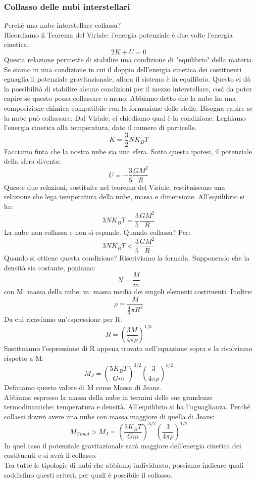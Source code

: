 \documentclass[a4paper,11pt]{article}
\begin{document}
\subsubsection{Collasso delle nubi interstellari}
Perché una nube interstellare collassa?\\
Ricordiamo il Teorema del Viriale: l'energia potenziale è due volte l'energia cinetica.
$$
2K + U = 0
$$
Questa relazione permette di stabilire una condizione di "equilibrio" della materia. Se siamo in una condizione in cui il doppio dell'energia cinetica dei costituenti eguaglia il potenziale gravitazionale, allora il sistema è in equilibrio. Questo ci dà la possibilità di stabilire alcune condizioni per il mezzo interstellare, così da poter capire se questo possa collassare o meno. Abbiamo detto che la nube ha una composizione chimica compatibile con la formazione delle stelle. Bisogna capire se la nube può collassare. Dal Viriale, ci chiediamo qual è la condizione. Leghiamo l'energia cinetica alla temperatura, dato il numero di particelle. \\
$$
K = \frac{3}{2} N K_{B} T
$$
Facciamo finta che la nostra nube sia una sfera. Sotto questa ipotesi, il potenziale della sfera diventa:
$$
U = - \frac{3}{5} \frac{GM^{2}}{R}
$$
Queste due relazioni, sostituite nel teorema del Viriale, restituiscono una relazione che lega temperatura della nube, massa e dimensione. All'equilibrio si ha:
$$
3NK_{B}T=\frac{3}{5} \frac{GM^{2}}{R}
$$
La nube non collassa e non si espande. Quando collassa? Per:
$$
3NK_{B}T <\frac{3}{5} \frac{GM^{2}}{R}
$$
Quando si ottiene questa condizione? Riscriviamo la formula. Supponendo che la densità sia costante, poniamo:
$$
N = \frac{M}{m}
$$
con M: massa della nube; m: massa media dei singoli elementi costituenti. Inoltre:
$$
\rho = \frac{M}{\frac{4}{3}\pi R^{3}}
$$
Da cui ricaviamo un'espressione per R:
$$
R = (\frac{3M}{4\pi \rho})^{1/3}
$$
Sostituiamo l'espressione di R appena trovata nell'equazione sopra e la risolviamo rispetto a M:
$$
M_{J}=(\frac{5K_{B}T}{Gm})^{3/2} (\frac{3}{4\pi \rho})^{1/2}
$$
Definiamo questo valore di M come Massa di Jeans.\\ Abbiamo espresso la massa della nube in termini delle sue grandezze termodinamiche: temperatura e densità. All'equilibrio si ha l'uguaglianza. Perché collassi dovrei avere una nube con massa maggiore di quella di Jeans:
$$
M_{Cloud}>M_{J}=(\frac{5K_{B}T}{Gm})^{3/2} (\frac{3}{4\pi \rho})^{1/2}
$$
In quel caso il potenziale gravitazionale sarà maggiore dell'energia cinetica dei costituenti e si avrà il collasso.\\ Tra tutte le tipologie di nubi che abbiamo individuato, possiamo indicare quali soddisfino questi criteri, per quali è possibile il collasso. \\
\end{document}
